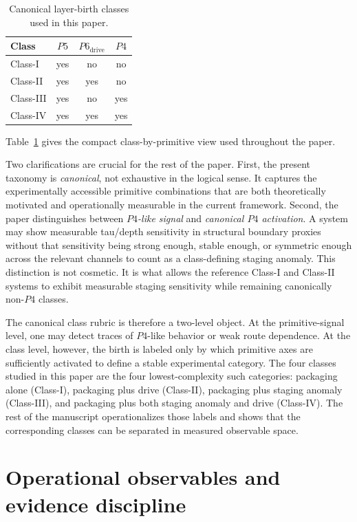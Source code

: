 \documentclass[11pt]{article}
\begin{document}
\begin{table}[tbp]
\centering
\caption{Canonical layer-birth classes used in this paper.}
\label{tab:canonical-layer-birth-classes}
\begin{tabular}{@{}lccc@{}}
\toprule
Class & $P5$ & $P6_{\mathrm{drive}}$ & $P4$ \\
\midrule
Class-I  & yes & no  & no  \\
Class-II & yes & yes & no  \\
Class-III & yes & no  & yes \\
Class-IV  & yes & yes & yes \\
\bottomrule
\end{tabular}
\end{table}

Table~\ref{tab:canonical-layer-birth-classes} gives the compact class-by-primitive view used throughout the paper.

Two clarifications are crucial for the rest of the paper. First, the present taxonomy is \emph{canonical}, not exhaustive in the logical sense. It captures the experimentally accessible primitive combinations that are both theoretically motivated and operationally measurable in the current framework. Second, the paper distinguishes between \emph{$P4$-like signal} and \emph{canonical $P4$ activation}. A system may show measurable tau/depth sensitivity in structural boundary proxies without that sensitivity being strong enough, stable enough, or symmetric enough across the relevant channels to count as a class-defining staging anomaly. This distinction is not cosmetic. It is what allows the reference Class-I and Class-II systems to exhibit measurable staging sensitivity while remaining canonically non-$P4$ classes.

The canonical class rubric is therefore a two-level object. At the primitive-signal level, one may detect traces of $P4$-like behavior or weak route dependence. At the class level, however, the birth is labeled only by which primitive axes are sufficiently activated to define a stable experimental category. The four classes studied in this paper are the four lowest-complexity such categories: packaging alone (Class-I), packaging plus drive (Class-II), packaging plus staging anomaly (Class-III), and packaging plus both staging anomaly and drive (Class-IV). The rest of the manuscript operationalizes those labels and shows that the corresponding classes can be separated in measured observable space.
 \section{Operational observables and evidence discipline}
\label{sec:observables-evidence}
\end{document}
